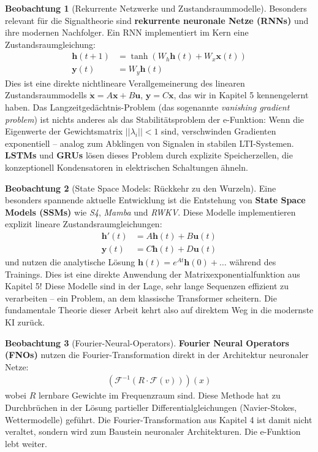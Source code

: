﻿\documentclass[a4paper,12pt]{report}
\theoremstyle{definition}
\newtheorem{beobachtung}{Beobachtung}
\begin{document}
	\begin{beobachtung}[Rekurrente Netzwerke und Zustandsraummodelle]
		Besonders relevant für die Signaltheorie sind \textbf{rekurrente neuronale Netze (RNNs)} und ihre modernen Nachfolger. Ein RNN implementiert im Kern eine Zustandsraumgleichung:
		\begin{align}
			\mathbf{h}(t+1) &= \tanh(W_h \mathbf{h}(t) + W_x \mathbf{x}(t)) \\
			\mathbf{y}(t) &= W_y \mathbf{h}(t)
		\end{align}
		Dies ist eine direkte nichtlineare Verallgemeinerung des linearen Zustandsraummodells $\dot{\mathbf{x}} = A\mathbf{x} + B\mathbf{u}$, $\mathbf{y} = C\mathbf{x}$, das wir in Kapitel 5 kennengelernt haben. Das Langzeitgedächtnis-Problem (das sogenannte \emph{vanishing gradient problem}) ist nichts anderes als das Stabilitätsproblem der e-Funktion: Wenn die Eigenwerte der Gewichtsmatrix $|{|\lambda_i|}| < 1$ sind, verschwinden Gradienten exponentiell -- analog zum Abklingen von Signalen in stabilen LTI-Systemen. \textbf{LSTMs} und \textbf{GRUs} lösen dieses Problem durch explizite Speicherzellen, die konzeptionell Kondensatoren in elektrischen Schaltungen ähneln.
	\end{beobachtung}
	
	\begin{beobachtung}[State Space Models: Rückkehr zu den Wurzeln]
		Eine besonders spannende aktuelle Entwicklung ist die Entstehung von \textbf{State Space Models (SSMs)} wie \emph{S4}, \emph{Mamba} und \emph{RWKV}. Diese Modelle implementieren explizit lineare Zustandsraumgleichungen:
		\begin{align}
			\mathbf{h}'(t) &= A\mathbf{h}(t) + B\mathbf{u}(t) \\
			\mathbf{y}(t) &= C\mathbf{h}(t) + D\mathbf{u}(t)
		\end{align}
		und nutzen die analytische Lösung $\mathbf{h}(t) = e^{At}\mathbf{h}(0) + \ldots$ während des Trainings. Dies ist eine direkte Anwendung der Matrixexponentialfunktion aus Kapitel 5! Diese Modelle sind in der Lage, sehr lange Sequenzen effizient zu verarbeiten -- ein Problem, an dem klassische Transformer scheitern. Die fundamentale Theorie dieser Arbeit kehrt also auf direktem Weg in die modernste KI zurück.
	\end{beobachtung}
	
	\begin{beobachtung}[Fourier-Neural-Operators]
		\textbf{Fourier Neural Operators (FNOs)} nutzen die Fourier-Transformation direkt in der Architektur neuronaler Netze:
		\begin{align}
			(\mathcal{F}^{-1}(R \cdot \mathcal{F}(v)))(x)
		\end{align}
		wobei $R$ lernbare Gewichte im Frequenzraum sind. Diese Methode hat zu Durchbrüchen in der Lösung partieller Differentialgleichungen (Navier-Stokes, Wettermodelle) geführt. Die Fourier-Transformation aus Kapitel 4 ist damit nicht veraltet, sondern wird zum Baustein neuronaler Architekturen. Die e-Funktion lebt weiter.
	\end{beobachtung}
	
\end{document}
